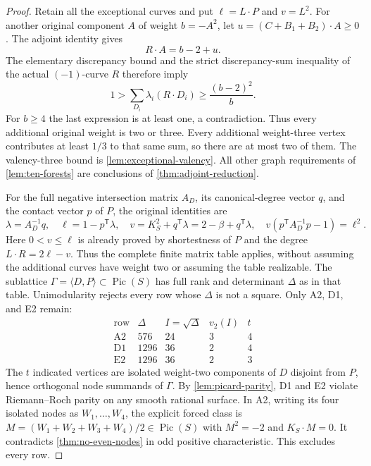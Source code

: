 \documentclass[11pt,reqno]{amsart}
\theoremstyle{definition}
\theoremstyle{remark}
\DeclareMathOperator{\Pic}{Pic}
\numberwithin{equation}{section}
\begin{document}
\begin{proof}
Retain all the exceptional curves and put $\ell=L\cdot P$ and $v=L^2$.
For another original component $A$ of weight $b=-A^2$, let
$u=(C+B_1+B_2)\cdot A\ge0$. The adjoint identity gives
\[
 R\cdot A=b-2+u.
\]
The elementary discrepancy bound and the strict discrepancy-sum inequality of the actual
$(-1)$-curve $R$ therefore imply
\[
 1>\sum_{D_i}\lambda_i(R\cdot D_i)
       \ge\frac{(b-2)^2}{b}.
\]
For $b\ge4$ the last expression is at least one, a contradiction.
Thus every additional original weight is two or three. Every additional
weight-three vertex contributes at least $1/3$ to that same sum,
so there are at most two of them. The valency-three bound is \cref{lem:exceptional-valency}. All other graph requirements of
\cref{lem:ten-forests} are conclusions of
\cref{thm:adjoint-reduction}.

For the full negative intersection matrix $A_D$, its canonical-degree
vector $q$, and the contact vector $p$ of $P$, the original identities
are
\[
 \lambda=A_D^{-1}q,\quad
 \ell=1-p^{\mathsf T}\lambda,\quad
 v=K_S^2+q^{\mathsf T}\lambda=2-\beta+q^{\mathsf T}\lambda,
 \quad v(p^{\mathsf T}A_D^{-1}p-1)=\ell^2.
\]
Here $0<v\le\ell$ is already proved by shortestness of $P$ and the
degree $L\cdot R=2\ell-v$.
Thus the complete finite matrix table applies, without assuming the
additional curves have weight two or assuming the table realizable.
The sublattice $\Gamma=\langle D,P\rangle\subset\Pic(S)$ has full rank
and determinant $\Delta$ as in that table. Unimodularity rejects every
row whose $\Delta$ is not a square. Only A2, D1, and E2 remain:
\[
\begin{array}{c|rrrr}
\text{row}&\Delta&I=\sqrt\Delta&v_2(I)&t\\\hline
\mathrm{A2}&576&24&3&4\\
\mathrm{D1}&1296&36&2&4\\
\mathrm{E2}&1296&36&2&3
\end{array}
\]
The $t$ indicated vertices are isolated weight-two components of
$D$ disjoint from $P$, hence orthogonal node summands of $\Gamma$.
By \cref{lem:picard-parity}, D1 and E2 violate Riemann--Roch parity
on any smooth rational surface. In A2, writing its four isolated nodes
as $W_1,\ldots,W_4$, the explicit forced class is
$M=(W_1+W_2+W_3+W_4)/2\in\Pic(S)$ with $M^2=-2$ and $K_S\cdot M=0$.
It contradicts \cref{thm:no-even-nodes} in odd positive characteristic.
This excludes every row.
\end{proof}
\end{document}
